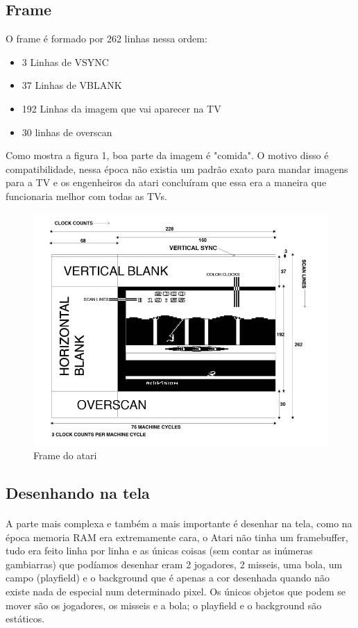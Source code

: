 \documentclass{article}
\begin{document}
\subsection{Frame}
O frame é formado por 262 linhas nessa ordem: 
\begin{itemize}
	\item 3 Linhas de VSYNC
	\item 37 Linhas de VBLANK
	\item 192 Linhas da imagem que vai aparecer na TV
	\item 30 linhas de overscan
\end{itemize}

Como mostra a figura 1, boa parte da imagem é "comida". O motivo disso é compatibilidade, nessa época não existia um padrão exato para mandar imagens para a TV e os engenheiros da atari concluíram que essa era a maneira que funcionaria melhor com todas as TVs.

\begin{figure}[h]
	\caption{Frame do atari}
	\includegraphics[width=\textwidth]{televisionscreen}
\end{figure}

\subsection{Desenhando na tela}
\paragraph{}
A parte mais complexa e também a mais importante é desenhar na tela, como na época memoria RAM era extremamente cara, o Atari não tinha um framebuffer, tudo era feito linha por linha e as únicas coisas (sem contar as inúmeras gambiarras) que podíamos desenhar eram 2 jogadores, 2 misseis, uma bola, um campo (playfield) e o background que é apenas a cor desenhada quando não existe nada de especial num determinado pixel. Os únicos objetos que podem se mover são os jogadores, os misseis e a bola; o playfield e o background são estáticos.
\end{document}
